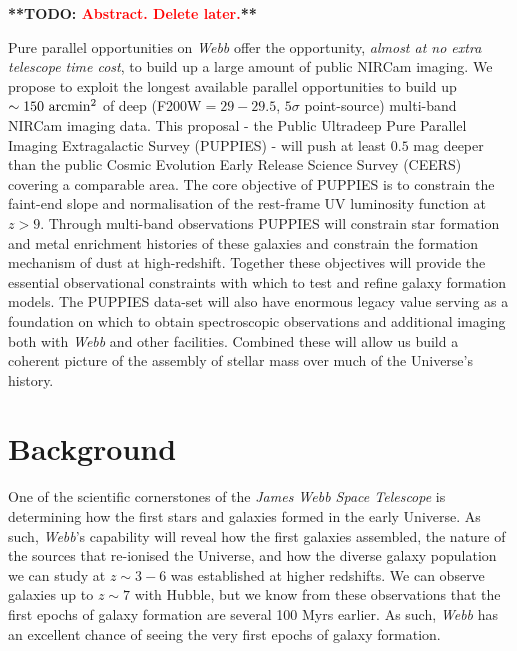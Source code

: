 \documentclass[12pt]{article}
\newcommand{\todo}[1]{\textbf{**TODO: \textcolor{red}{#1}**}}
\begin{document}
%
%

\todo{Abstract. Delete later.}

Pure parallel opportunities on \emph{Webb} offer the opportunity, \emph{almost at no extra telescope time cost}, to build up a large amount of public NIRCam imaging. We propose to exploit the longest available parallel opportunities to build up $\sim 150\ {\rm arcmin^2}$ of deep (F200W$=29-29.5$, $5\sigma$ point-source) multi-band NIRCam imaging data. This proposal - the Public Ultradeep Pure Parallel Imaging Extragalactic Survey (PUPPIES) - will push at least $0.5$ mag deeper than the public Cosmic Evolution Early Release Science Survey (CEERS) covering a comparable area. The core objective of PUPPIES is to constrain the faint-end slope and normalisation of the rest-frame UV luminosity function at $z>9$. Through  multi-band observations PUPPIES will constrain star formation and metal enrichment histories of these galaxies and constrain the formation mechanism of dust at high-redshift. Together these objectives will provide the essential observational constraints with  which to test and refine galaxy formation models. The PUPPIES data-set will also have enormous legacy value serving as a foundation on which to obtain spectroscopic observations and additional imaging both with \emph{Webb} and other facilities. Combined these will allow us build a coherent picture of the assembly of stellar mass over much of the Universe's history. 


\clearpage

\justification          %

\section{Background}

One of the scientific cornerstones of the \emph{James Webb Space Telescope} is determining how the first stars and galaxies formed in the early Universe. As such, \emph{Webb}'s capability will reveal how the first galaxies assembled, the nature of the sources that re-ionised the Universe, and how the diverse galaxy population we can study at $z \sim 3-6$ was established at higher redshifts.  We can observe galaxies up to $z \sim 7$ with Hubble, but we know from these observations that the first epochs of galaxy formation are several 100 Myrs earlier.  As such, \emph{Webb} has an excellent chance of seeing the very first epochs of galaxy formation.
\end{document}
